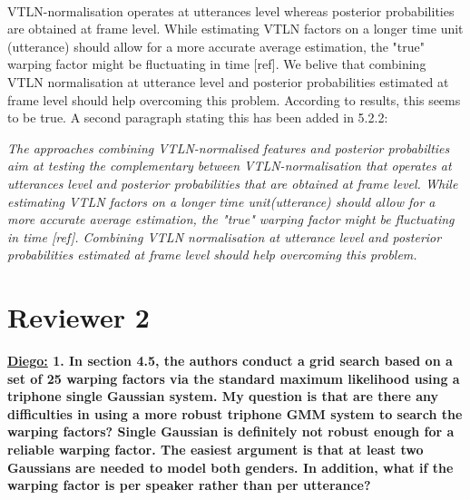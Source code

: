 \documentclass[]{article}
\begin{document}
~

VTLN-normalisation operates at utterances level whereas posterior probabilities are obtained at frame level. While estimating VTLN factors on a longer time unit (utterance) should allow for a more accurate average estimation, the "true" warping factor might be fluctuating in time [ref]. We belive that combining VTLN normalisation at utterance level and posterior probabilities estimated at frame level should help overcoming this problem. According to results, this seems to be true. A second paragraph stating this has been added in 5.2.2:

\textit{The approaches combining VTLN-normalised features and posterior probabilties aim at testing the complementary between VTLN-normalisation that operates at utterances level and posterior probabilities that are obtained at frame level. While estimating VTLN factors on a longer time unit(utterance) should allow for a more accurate average estimation, the "true" warping factor might be fluctuating in time [ref]. Combining VTLN normalisation at utterance level and posterior probabilities estimated at frame level should help overcoming this problem.}


\section{Reviewer 2}

\textbf{\underline{Diego:} 1. In section 4.5, the authors conduct a grid search based on a set of 25 warping factors via the standard maximum likelihood using a triphone single Gaussian system. My question is that are there any difficulties in using a more robust triphone GMM system to search the warping factors? Single Gaussian is definitely not robust enough for a reliable warping factor. The easiest argument is
that at least two Gaussians are needed to model both genders. In addition, what if the warping factor is per speaker rather than per utterance?}
\end{document}
